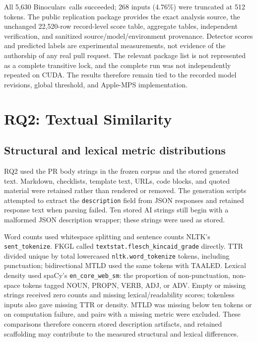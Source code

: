 \documentclass[11pt,a4paper]{article}
\newcommand{\binocularsDetector}{Binoculars}
\begin{document}
All 5,630 \binocularsDetector~calls succeeded; 268 inputs (4.76\%) were truncated at 512 tokens.
The public replication package provides the exact analysis source, the unchanged 22,520-row
record-level score table, aggregate tables, independent verification, and sanitized
source/model/environment provenance. Detector scores and predicted labels are experimental
measurements, not evidence of the authorship of any real pull request. The relevant package list is
not represented as a complete transitive lock, and the complete run was not independently
repeated on CUDA. The results therefore remain tied to the recorded model revisions, global
threshold, and Apple-MPS implementation.

\section{RQ2: Textual Similarity}

\subsection{Structural and lexical metric distributions}

RQ2 used the PR body strings in the frozen corpus and the stored generated text. Markdown, checklists, template text, URLs, code blocks, and quoted material were retained rather than rendered or removed. The generation scripts attempted to extract the \texttt{description} field from JSON responses and retained response text when parsing failed. Ten stored AI strings still begin with a malformed JSON description wrapper; these strings were used as stored.

Word counts used whitespace splitting and sentence counts NLTK's \texttt{sent\_tokenize}. FKGL called \texttt{textstat.flesch\_kincaid\_grade} directly. TTR divided unique by total lowercased \texttt{nltk.word\_tokenize} tokens, including punctuation; bidirectional MTLD used the same tokens with TAALED. Lexical density used spaCy's \texttt{en\_core\_web\_sm}: the proportion of non-punctuation, non-space tokens tagged NOUN, PROPN, VERB, ADJ, or ADV. Empty or missing strings received zero counts and missing lexical/readability scores; tokenless inputs also gave missing TTR or density. MTLD was missing below ten tokens or on computation failure, and pairs with a missing metric were excluded. These comparisons therefore concern stored description artifacts, and retained scaffolding may contribute to the measured structural and lexical differences.
\end{document}
